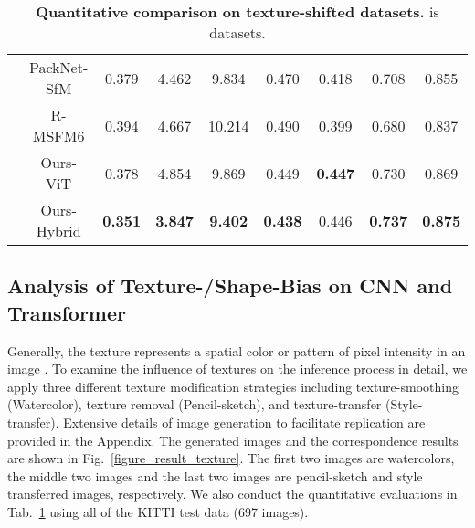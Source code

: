 \documentclass[letterpaper]{article} \usepackage{aaai23}  \usepackage{times}  \usepackage{helvet}  \usepackage{courier}  \usepackage[hyphens]{url}  \usepackage{graphicx} \urlstyle{rm} \def\UrlFont{\rm}  \usepackage{natbib}  \usepackage{caption} \frenchspacing  \setlength{\pdfpagewidth}{8.5in} \setlength{\pdfpageheight}{11in} \usepackage{algorithm}
\newcommand{\tabref}[1]{Tab.~\ref{#1}}
\newcommand{\figref}[1]{Fig.~\ref{#1}}
\begin{document}
\begin{table}[t!]
{\begin{tabular}{ccccccccc}
                              & PackNet-SfM          & 0.379          & 4.462          & 9.834          & 0.470          & 0.418          & 0.708          & 0.855          \\
                              & R-MSFM6          & 0.394          & 4.667          & 10.214         & 0.490          & 0.399          & 0.680          & 0.837          \\ \cline{2-9} 
                              & Ours-ViT       & 0.378          & 4.854          & 9.869          & 0.449          & \textbf{0.447} & 0.730 & 0.869          \\
                              & Ours-Hybrid & \textbf{0.351} & \textbf{3.847} & \textbf{9.402} & \textbf{0.438} & 0.446          & \textbf{0.737} & \textbf{0.875} \\ \hline
\end{tabular}}
\caption{\textbf{Quantitative comparison on texture-shifted datasets.}  is datasets.}
\label{table_result_texture}
\vspace{-0.4cm}
\end{table}


\subsection{Analysis of Texture-/Shape-Bias on CNN and Transformer}
\label{texture/shaep}


Generally, the texture represents a spatial color or pattern of pixel intensity in an image \cite{armi2019texture}.
To examine the influence of textures on the inference process in detail, we apply three different texture modification strategies including texture-smoothing (Watercolor), texture removal (Pencil-sketch), and texture-transfer (Style-transfer). Extensive details of image generation to facilitate replication are provided in the Appendix.
The generated images and the correspondence results are shown in \figref{figure_result_texture}. The first two images are watercolors, the middle two images and the last two images are pencil-sketch and style transferred images, respectively.
We also conduct the quantitative evaluations in \tabref{table_result_texture} using all of the KITTI test data (697 images).
\end{document}
